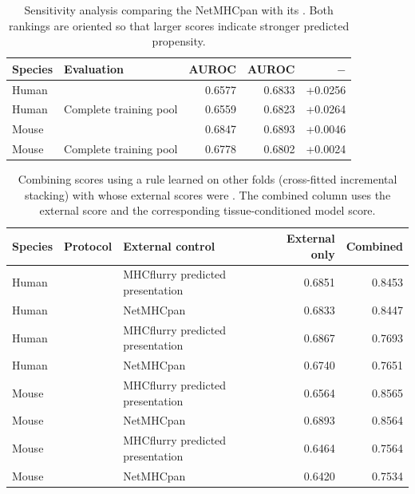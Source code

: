 \begin{table}[htbp]
\centering
\caption{Sensitivity analysis comparing the NetMHCpan \plainBA{} with its \plainEL{}. Both rankings are oriented so that larger scores indicate stronger predicted propensity.}
\label{tab:appendix-netmhcpan-el-ba}
\small
\setlength{\tabcolsep}{4pt}
\begin{tabularx}{\textwidth}{>{\raggedright\arraybackslash}p{1.0cm}
                            >{\raggedright\arraybackslash}Xrrr}
\toprule
Species & Evaluation & \plainBA{} AUROC & \plainEL{} AUROC & \plainEL{} $-$ \plainBA{} \\
\midrule
Human & \plainFixedTest{} & 0.6577 & 0.6833 & +0.0256 \\
Human & Complete training pool & 0.6559 & 0.6823 & +0.0264 \\
Mouse & \plainFixedTest{} & 0.6847 & 0.6893 & +0.0046 \\
Mouse & Complete training pool & 0.6778 & 0.6802 & +0.0024 \\
\bottomrule
\end{tabularx}
\end{table}

\begin{table}[htbp]
\centering
\caption{Combining scores using a rule learned on other folds (cross-fitted incremental stacking) with \plainGeneralPMHC{} whose external scores were \plainFrozen{}. The combined column uses the external score and the corresponding tissue-conditioned model score.}
\label{tab:appendix-general-stacking}
\footnotesize
\setlength{\tabcolsep}{3pt}
\begin{tabularx}{\textwidth}{>{\raggedright\arraybackslash}p{1.0cm}
                            >{\raggedright\arraybackslash}X
                            >{\raggedright\arraybackslash}Xrr}
\toprule
Species & Protocol & External control & External only & Combined \\
\midrule
Human & \plainFixedTest{} & MHCflurry predicted presentation & 0.6851 & 0.8453 \\
Human & \plainFixedTest{} & NetMHCpan \plainEL{} & 0.6833 & 0.8447 \\
Human & \plainPeptideOOF{} & MHCflurry predicted presentation & 0.6867 & 0.7693 \\
Human & \plainPeptideOOF{} & NetMHCpan \plainEL{} & 0.6740 & 0.7651 \\
Mouse & \plainFixedTest{} & MHCflurry predicted presentation & 0.6564 & 0.8565 \\
Mouse & \plainFixedTest{} & NetMHCpan \plainEL{} & 0.6893 & 0.8564 \\
Mouse & \plainPeptideOOF{} & MHCflurry predicted presentation & 0.6464 & 0.7564 \\
Mouse & \plainPeptideOOF{} & NetMHCpan \plainEL{} & 0.6420 & 0.7534 \\
\bottomrule
\end{tabularx}
\end{table}
